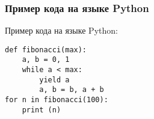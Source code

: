 \documentclass[14pt]{beamer}
\begin{document}
{\subsubsection{Пример кода на языке Python}

\begin{frame}[fragile]
\begin{block}{Пример кода на языке Python:}
\begin{lstlisting}
def fibonacci(max):        
    a, b = 0, 1
    while a < max:
        yield a            
        a, b = b, a + b    
for n in fibonacci(100):   
    print (n)
\end{lstlisting}
\end{block}

\begin{center}
\hyperlink{menu}{}
\end{center}
\end{frame}
}
\end{document}

